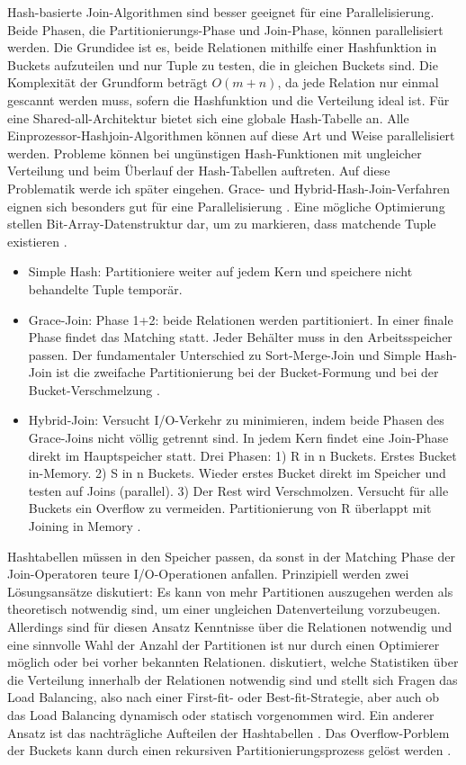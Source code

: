 \documentclass[a4paper,12pt,twoside]{article}
\begin{document}
Hash-basierte Join-Algorithmen sind besser geeignet für eine Parallelisierung. Beide Phasen, die Partitionierungs-Phase und Join-Phase, können parallelisiert werden. Die Grundidee ist es, beide Relationen mithilfe einer Hashfunktion in Buckets aufzuteilen und nur Tuple zu testen, die in gleichen Buckets sind. Die Komplexität der Grundform beträgt $O(m + n)$, da jede Relation nur einmal gescannt werden muss, sofern die Hashfunktion und die Verteilung ideal ist. Für eine Shared-all-Architektur bietet sich eine globale Hash-Tabelle an. Alle Einprozessor-Hashjoin-Algorithmen können auf diese Art und Weise parallelisiert werden. Probleme können bei ungünstigen Hash-Funktionen mit ungleicher Verteilung und beim Überlauf der Hash-Tabellen auftreten. Auf diese Problematik werde ich später eingehen. Grace- und Hybrid-Hash-Join-Verfahren eignen sich besonders gut für eine Parallelisierung {\autocite{DeWitt1985}}. Eine mögliche Optimierung stellen Bit-Array-Datenstruktur dar, um zu markieren, dass matchende Tuple existieren {\autocite{Valduriez1984}}.

\begin{itemize}
	\item Simple Hash: Partitioniere weiter auf jedem Kern und speichere nicht behandelte Tuple temporär.{\autocite{Lu1994}}
	\item Grace-Join: Phase 1+2: beide Relationen werden partitioniert. In einer finale Phase findet das Matching statt. Jeder Behälter muss in den Arbeitsspeicher passen. Der fundamentaler Unterschied zu Sort-Merge-Join und Simple Hash-Join ist die zweifache Partitionierung bei der Bucket-Formung und bei der Bucket-Verschmelzung {\autocite{Schneider1989}}.
	\item Hybrid-Join: Versucht I/O-Verkehr zu minimieren, indem beide Phasen des Grace-Joins nicht völlig getrennt sind. In jedem Kern findet eine Join-Phase direkt im Hauptspeicher statt. Drei Phasen: 1) R in n Buckets. Erstes Bucket in-Memory. 2) S in n Buckets. Wieder erstes Bucket direkt im Speicher und testen auf Joins (parallel). 3) Der Rest wird Verschmolzen. Versucht für alle Buckets ein Overflow zu vermeiden. Partitionierung von R überlappt mit Joining in Memory {\autocite{Schneider1989}}.
\end{itemize}

Hashtabellen müssen in den Speicher passen, da sonst in der Matching Phase der Join-Operatoren teure I/O-Operationen anfallen. Prinzipiell werden zwei Lösungsansätze diskutiert: Es kann von mehr Partitionen auszugehen werden als theoretisch notwendig sind, um einer ungleichen Datenverteilung vorzubeugen. Allerdings sind für diesen Ansatz Kenntnisse über die Relationen notwendig und eine sinnvolle Wahl der Anzahl der Partitionen ist nur durch einen Optimierer möglich oder bei vorher bekannten Relationen. {\textcite{Lu1994}} diskutiert, welche Statistiken über die Verteilung innerhalb der Relationen notwendig sind und stellt sich Fragen das Load Balancing, also nach einer First-fit- oder Best-fit-Strategie, aber auch ob das Load Balancing dynamisch oder statisch vorgenommen wird.  Ein anderer Ansatz ist das nachträgliche Aufteilen der Hashtabellen {\autocite{Mishra1992}}. Das Overflow-Porblem der Buckets kann durch einen rekursiven Partitionierungsprozess gelöst werden {}.
\end{document}
